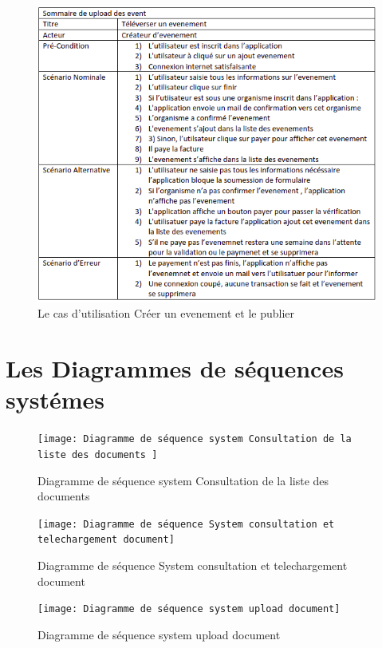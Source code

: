 \documentclass[12pt]{report}
\begin{document}
\newpage

\begin{figure}[h]
    \centering
    \includegraphics[width=1\textwidth]{eventUpload}
    \caption{Le cas d'utilisation Créer un evenement et le publier}
    \label{fig:mesh6}
\end{figure}

\newpage

\section{Les Diagrammes de séquences systémes}


\begin{figure}[h]
    \centering
    \texttt{[image: Diagramme de séquence system Consultation de la liste des documents ]}
    \caption{Diagramme de séquence system Consultation de la liste des documents}
    \label{fig:mesh6}
\end{figure}

\newpage

\begin{figure}[h]
    \centering
    \texttt{[image: Diagramme de séquence System consultation et telechargement document]}
    \caption{Diagramme de séquence System consultation et telechargement document}
    \label{fig:mesh6}
\end{figure}

\newpage

\begin{figure}[h]
    \centering
    \texttt{[image: Diagramme de séquence system upload document]}
    \caption{Diagramme de séquence system upload document}
    \label{fig:mesh6}
\end{figure}
\end{document}

